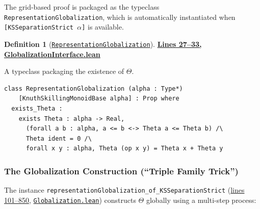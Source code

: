\documentclass[11pt]{article}
\theoremstyle{definition}
\newtheorem{definition}[theorem]{Definition}
\theoremstyle{remark}
\begin{document}
The grid-based proof is packaged as the typeclass \texttt{RepresentationGlobalization},
which is automatically instantiated when \texttt{[KSSeparationStrict $\alpha$]} is available.

\begin{definition}[\href{https://github.com/zariuq/ks-foundations-of-inference/blob/main/KnuthSkilling/Additive/Proofs/GridInduction/GlobalizationInterface.lean\#L27}{\texttt{RepresentationGlobalization}}]
\textbf{\href{https://github.com/zariuq/ks-foundations-of-inference/blob/main/KnuthSkilling/Additive/Proofs/GridInduction/GlobalizationInterface.lean\#L27-L33}{Lines 27--33, GlobalizationInterface.lean}}

A typeclass packaging the existence of $\Theta$.
\end{definition}

\begin{lstlisting}[caption={RepresentationGlobalization typeclass}]
class RepresentationGlobalization (alpha : Type*)
    [KnuthSkillingMonoidBase alpha] : Prop where
  exists_Theta :
    exists Theta : alpha -> Real,
      (forall a b : alpha, a <= b <-> Theta a <= Theta b) /\
      Theta ident = 0 /\
      forall x y : alpha, Theta (op x y) = Theta x + Theta y
\end{lstlisting}

\subsubsection{The Globalization Construction (``Triple Family Trick'')}

The instance \texttt{representationGlobalization\_of\_KSSeparationStrict} (\href{https://github.com/zariuq/ks-foundations-of-inference/blob/main/KnuthSkilling/Additive/Proofs/GridInduction/Globalization.lean\#L101-L850}{lines 101--850}, \href{https://github.com/zariuq/ks-foundations-of-inference/blob/main/KnuthSkilling/Additive/Proofs/GridInduction/Globalization.lean}{\texttt{Globalization.lean}})
constructs $\Theta$ globally using a multi-step process:
\end{document}
